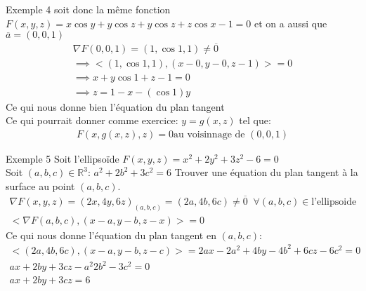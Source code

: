 \begin{parag}{Exemple 4}
    soit donc la même fonction $F\left(x, y, z\right) = x\cos y + y \cos z + y \cos z + z \cos x - 1 = 0$ et on a aussi que $\overline{a} = \left(0, 0, 1\right)$\\
\begin{align*} \nabla F\left(0, 0, 1\right) = \left(1, \cos 1, 1\right) \neq \overline{0} \\
\implies <\left(1, \cos 1, 1\right), \left(x-0, y-0, z-1\right)> = 0\\
\implies x + y \cos 1 + z-1 = 0\\
\implies z =  1 - x - \left(\cos 1\right)y
\end{align*}
Ce qui nous donne bien l'équation du plan tangent\\
Ce qui pourrait donner comme exercice: $y =  g\left(x, z\right)$ tel que:
\begin{align*} F\left(x, g\left(x, z\right), z\right) = 0 \text{au voisinnage de } \left(0, 0, 1\right) \end{align*}
\end{parag}
\begin{parag}{Exemple 5}
    Soit l'ellipsoïde $F\left(x, y, z\right) =  x^2 + 2y^2 + 3z^2 - 6 = 0$\\
    Soit $\left(a, b, c\right) \in \mathbb{R}^3$: $a^2 + 2b^2 + 3c^2 = 6 $ Trouver une équation du plan tangent à la surface au point $\left(a, b, c\right)$.\\
    \begin{align*} 
        \nabla F\left(x, y, z\right) = \left(2x, 4y, 6z\right)_{\left(a, b, c\right)} = \left(2a, 4b, 6c\right) \neq \overline{0} \;\; \forall \left(a, b, c\right) \in \text{l'ellipsoide}\\
        <\nabla F\left(a, b, c\right), \left(x-a, y-b, z-x\right) > = 0
    \end{align*}
    Ce qui nous donne l'équation du plan tangent en $\left(a, b, c\right)$:
    \begin{align*}
        <\left(2a, 4b, 6c\right), \left(x-a, y-b, z-c\right)> = 2ax -2a^2 + 4by - 4b^2 + 6cz - 6c^2 = 0 \\ 
    ax + 2by + 3cz - a^2 2b^2 - 3c^2 = 0\\
ax + 2by + 3cz = 6
\end{align*}
    \end{parag}




